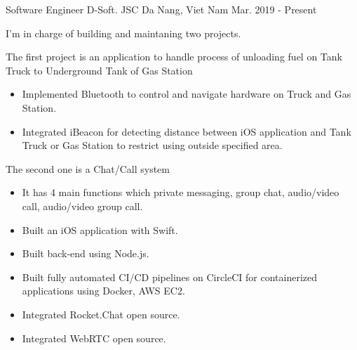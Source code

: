 

\begin{cventries}

  \cventry
    {Software Engineer} %
    {D-Soft. JSC} %
    {Da Nang, Viet Nam} %
    {Mar. 2019 - Present} %
    {
      \begin{cvitems} %
        \item {I'm in charge of building and maintaning two projects.}
        \item {The first project is an application to handle process of unloading fuel on Tank Truck to Underground Tank of Gas Station}
          \begin{itemize}
            \item {Implemented Bluetooth to control and navigate hardware on Truck and Gas Station.}
            \item {Integrated iBeacon for detecting distance between iOS application and Tank Truck or Gas Station to restrict using outside specified area.}
          \end{itemize}
        \item {The second one is a Chat/Call system}
          \begin{itemize}
            \item {It has 4 main functions which private messaging, group chat, audio/video call, audio/video group call.}
            \item {Built an iOS application with Swift.}
            \item {Built back-end using Node.js.}
            \item {Built fully automated CI/CD pipelines on CircleCI for containerized applications using Docker, AWS EC2.}
            \item {Integrated Rocket.Chat open source.}
            \item {Integrated WebRTC open source.}
          \end{itemize}
      \end{cvitems}
    }


\end{cventries}
